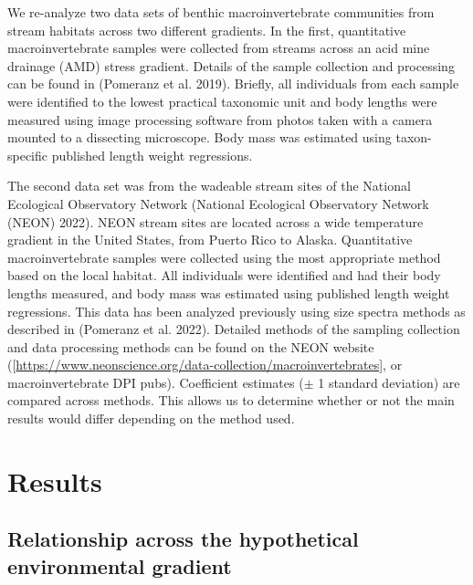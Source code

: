 \documentclass[
]{article}
\begin{document}
We re-analyze two data sets of benthic macroinvertebrate communities
from stream habitats across two different gradients. In the first,
quantitative macroinvertebrate samples were collected from streams
across an acid mine drainage (AMD) stress gradient. Details of the
sample collection and processing can be found in (Pomeranz et al. 2019).
Briefly, all individuals from each sample were identified to the lowest
practical taxonomic unit and body lengths were measured using image
processing software from photos taken with a camera mounted to a
dissecting microscope. Body mass was estimated using taxon-specific
published length weight regressions.

The second data set was from the wadeable stream sites of the National
Ecological Observatory Network (National Ecological Observatory Network
(NEON) 2022). NEON stream sites are located across a wide temperature
gradient in the United States, from Puerto Rico to Alaska. Quantitative
macroinvertebrate samples were collected using the most appropriate
method based on the local habitat. All individuals were identified and
had their body lengths measured, and body mass was estimated using
published length weight regressions. This data has been analyzed
previously using size spectra methods as described in (Pomeranz et al.
2022). Detailed methods of the sampling collection and data processing
methods can be found on the NEON website
({[}\url{https://www.neonscience.org/data-collection/macroinvertebrates}{]},
or macroinvertebrate DPI pubs). Coefficient estimates (\(\pm\) 1
standard deviation) are compared across methods. This allows us to
determine whether or not the main results would differ depending on the
method used.

\hypertarget{results}{%
\section{Results}\label{results}}

\hypertarget{relationship-across-the-hypothetical-environmental-gradient}{%
\subsection{Relationship across the hypothetical environmental
gradient}\label{relationship-across-the-hypothetical-environmental-gradient}}
\end{document}
